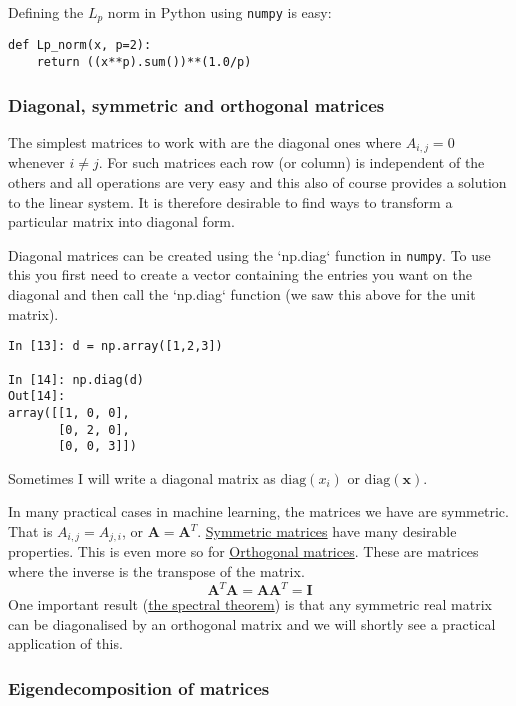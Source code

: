 \documentclass[a4paper,10pt]{article}
\newcommand{\link}[2]{{\color{blue}\href{#1}{#2}}}
\begin{document}
Defining the $L_p$ norm in Python using \texttt{numpy} is easy:
\begin{lstlisting}
def Lp_norm(x, p=2):
    return ((x**p).sum())**(1.0/p)
\end{lstlisting}

\subsubsection{ Diagonal, symmetric and orthogonal matrices}

The simplest matrices to work with are the diagonal ones where $A_{i,j}=0$ whenever $i\ne j$. For such matrices each row (or column) is independent of the others and all operations are very easy and this also of course provides a solution to the linear system. It is therefore desirable to find ways to transform a particular matrix into diagonal form. 

Diagonal matrices can be created using the `np.diag` function in \texttt{numpy}. To use this you first need to create a vector containing the entries you want on the diagonal and then call the `np.diag` function (we saw this above for the unit matrix).
\begin{lstlisting}
In [13]: d = np.array([1,2,3])

In [14]: np.diag(d)
Out[14]: 
array([[1, 0, 0],
       [0, 2, 0],
       [0, 0, 3]])

\end{lstlisting}

Sometimes I will write a diagonal matrix as $\mathrm{diag}(x_i)$ or $\mathrm{diag}(\mathbf{x})$. 


In many practical cases in machine learning, the matrices we have are symmetric. That is $A_{i,j} = A_{j, i}$, or $\mathbf{A}=\mathbf{A}^T$. \link{https://en.wikipedia.org/wiki/Symmetric_matrix}{Symmetric matrices} have many desirable properties. This is even more so for \link{https://en.wikipedia.org/wiki/Orthogonal_matrix}{Orthogonal matrices}. These are matrices where the inverse is the transpose of the matrix.
$$\mathbf{A}^T \mathbf{A} = \mathbf{A}\mathbf{A}^T = \mathbf{I}$$
One important result (\link{https://en.wikipedia.org/wiki/Spectral_theorem}{the spectral theorem}) is that any symmetric real matrix can be diagonalised by an orthogonal matrix and we will shortly see a practical application of this.

\subsubsection{ Eigendecomposition of matrices}
\end{document}
